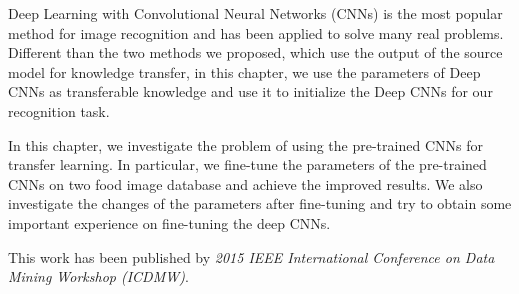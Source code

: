 Deep Learning with Convolutional Neural Networks (CNNs) is the most popular method for image recognition and has been applied to solve many real problems. Different than the two methods we proposed, which use the output of the source model for knowledge transfer, in this chapter, we use the parameters of Deep CNNs as transferable knowledge and use it to initialize the Deep CNNs for our recognition task.

In this chapter, we investigate the problem of using the pre-trained CNNs for transfer learning. In particular, we fine-tune the parameters of the pre-trained CNNs on two food image database and achieve the improved results. We also investigate the changes of the parameters after fine-tuning and try to obtain some important experience on fine-tuning the deep CNNs.

This work has been published by \textit{2015 IEEE International Conference on Data Mining Workshop (ICDMW)}.



